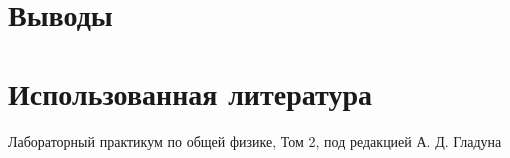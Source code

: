 \documentclass[12pt]{article}
\begin{document}
\section*{Выводы}


\section*{Использованная литература}
\begin{thebibliography}{9}
	Лабораторный практикум по общей физике, Том 2, под редакцией А. Д. Гладуна
\end{thebibliography}
\end{document}
